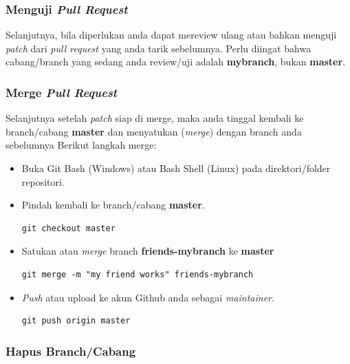 \documentclass[12pt]{article}
\begin{document}
	\subsubsection{Menguji \textit{Pull Request}}
	
	Selanjutnya, bila diperlukan anda dapat mereview ulang atau bahkan menguji \textit{patch} dari \textit{pull request} yang anda tarik sebelumnya.
	Perlu diingat bahwa cabang/branch yang sedang anda review/uji adalah \textbf{mybranch}, bukan \textbf{master}.

\newpage
	\subsubsection{Merge \textit{Pull Request}}
	
	Selanjutnya setelah \textit{patch} siap di merge, maka anda tinggal kembali ke branch/cabang \textbf{master} dan menyatukan (\textit{merge}) dengan branch anda sebelumnya
	Berikut langkah merge:
	
	\begin{itemize}
		\item Buka Git Bash (Windows) atau Bash Shell (Linux) pada direktori/folder repositori.
		
		\item Pindah kembali ke branch/cabang \textbf{master}.
		\begin{verbatim}
git checkout master
		\end{verbatim} 
		
		\item Satukan atau \textit{merge} branch \textbf{friends-mybranch} ke \textbf{master}
		\begin{verbatim}
git merge -m "my friend works" friends-mybranch
		\end{verbatim}

		\item \textit{Push} atau upload ke akun Github anda sebagai \textit{maintainer}.
		\begin{verbatim}
git push origin master
		\end{verbatim}
	\end{itemize} 
	
	\subsubsection{Hapus Branch/Cabang}
	
\end{document}
